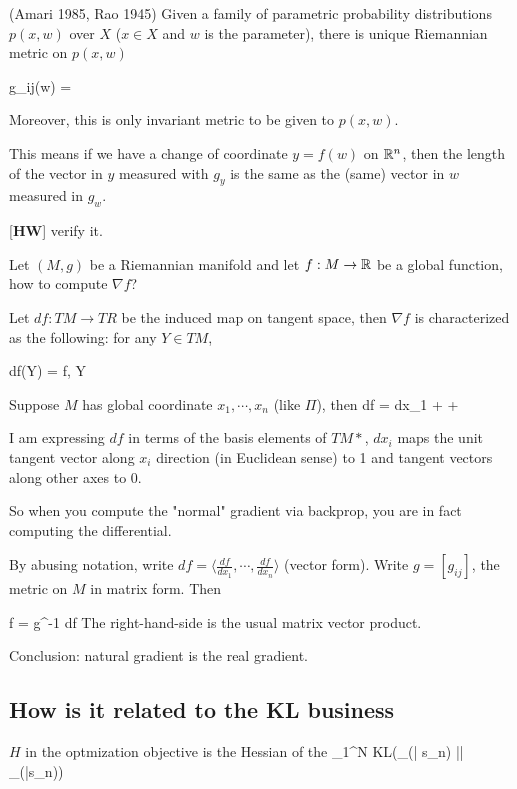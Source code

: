 \documentclass{article}
\let\[\relax \let\]\relax %
\DeclareRobustCommand{\[}{\begin{equation}}
\DeclareRobustCommand{\]}{\end{equation}}
\begin{document}
(Amari 1985, Rao 1945) 
Given a family of parametric probability distributions $p(x, w)$ over $X$ 
($x \in X$ and $w$ is the parameter), there is unique Riemannian metric 
on $p(x, w)$

\[
g_{ij}(w) = 
\]

Moreover, this is only invariant metric to be given to $p(x, w)$. 

This means if we have a change of coordinate $y = f(w)$ on $\mathbb{R}^n$, then 
the length of the vector in $y$ measured with $g_y$ is the same as the 
(same) vector in $w$ measured in $g_w$. 

[\textbf{HW}] verify it. 

Let $(M, g)$ be a Riemannian manifold and let $f: M \rightarrow \mathbb{R}$ be a 
global function, how to compute $\nabla f$?

Let $df: TM \rightarrow TR$ be the induced map on tangent space, then 
$\nabla f$ is characterized as the following: for any $Y \in TM$, 

\[
    df(Y) = \langle \nabla f, Y \rangle
\]

Suppose $M$ has global coordinate $x_1, \cdots, x_n$ (like $\Pi$), then 
\[
    df =  dx_1 + \cdots + 
\]

I am expressing $df$ in terms of the basis elements of $TM*$, $dx_i$ maps
the unit tangent vector along $x_i$ direction (in Euclidean sense) to 1 and 
tangent vectors along other axes to $0$. 

So when you compute the "normal" gradient via backprop, you are in fact 
computing the differential. 

By abusing notation, write $df = \langle \frac{df}{dx_1}, \cdots, 
\frac{df}{dx_n} \rangle $ (vector form). Write $g = [g_{ij}]$, the metric
on $M$ in matrix form. Then 

\[
    \nabla f = g^{-1} df
\]
The right-hand-side is the usual matrix vector product. 

Conclusion: natural gradient is the real gradient. 


\subsection{How is it related to the KL business}
$H$ in the optmization objective is the Hessian of the 
\[
 \sum_{1}^N 
KL(\pi_{\theta}(\cdot | s_n) || \pi_{\theta}(\cdot |s_n))
\]
\end{document}
